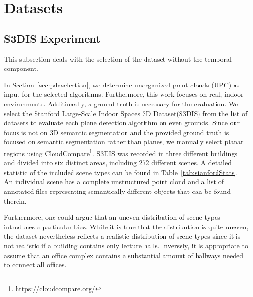 \documentclass[main.tex]{subfiles}
\begin{document}
\section{Datasets}

\subsection{S3DIS Experiment}
This subsection deals with the selection of the dataset without the temporal component.

In Section~\ref{sec:pdaselection}, we determine unorganized point clouds (UPC) as input for the selected algorithms. Furthermore, this work focuses on real, indoor environments.
Additionally, a ground truth is necessary for the evaluation.
We select the Stanford Large-Scale Indoor Spaces 3D Dataset(S3DIS)\cite{2017arXiv170201105A} from the list of datasets to evaluate each plane detection algorithm on even grounds.
Since our focus is not on 3D semantic segmentation and the provided ground truth is focused on semantic segmentation rather than planes, we manually select planar regions using CloudCompare\footnote{\href{https://cloudcompare.org/}{https://cloudcompare.org/}}.
S3DIS was recorded in three different buildings and divided into six distinct areas, including 272 different scenes. A detailed statistic of the included scene types can be found in Table~\ref{tab:stanfordStats}.
An individual scene has a complete unstructured point cloud and a list of annotated files representing semantically different objects that can be found therein.

Furthermore, one could argue that an uneven distribution of scene types introduces a particular bias. While it is true that the distribution is quite uneven, the dataset nevertheless reflects a realistic distribution of scene types since
it is not realistic if a building contains only lecture halls. Inversely, it is appropriate to assume that an office complex contains a substantial amount of hallways needed to connect all offices.
\end{document}
